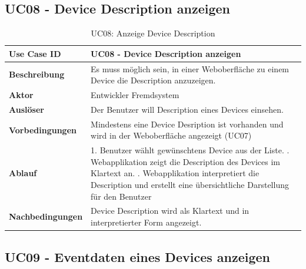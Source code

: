 \subsection{UC08 - Device Description anzeigen}
\begin{table}[H]
\begin{tabularx}{\textwidth}{|l|X|}

 \hline
 {\bf Use Case ID }    & UC08 - Device Description anzeigen \\  \hline
 {\bf Beschreibung }   & Es muss möglich sein, in einer Weboberfläche zu einem Device die Description anzuzeigen. \\ \hline
 {\bf Aktor }          & Entwickler Fremdsystem \\ \hline
 {\bf Auslöser }       & Der Benutzer will Description eines Devices einsehen. \\ \hline
 {\bf Vorbedingungen } & Mindestens eine Device Desription ist vorhanden und wird in der Weboberfläche angezeigt (UC07) \\ \hline
 {\bf Ablauf }         & 
     1. Benutzer wählt gewünschtens Device aus der Liste. \newline
     2. Webapplikation zeigt die Description des Devices im Klartext an. \newline
     3. Webapplikation interpretiert die Description und erstellt eine übersichtliche Darstellung für den Benutzer \\ \hline
 {\bf Nachbedingungen} & Device Description wird als Klartext und in interpretierter Form angezeigt.\\ \hline
  
\end{tabularx}
\caption{UC08: Anzeige Device Description}
\end{table}

\subsection{UC09 - Eventdaten eines Devices anzeigen}

